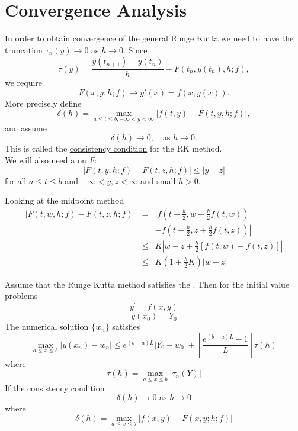 \section{Convergence Analysis}
In order to obtain convergence of the general Runge Kutta we need to have the truncation
$\tau_n(y)\rightarrow0$ as $h \rightarrow 0$.  Since
\[\tau(y)=\frac{y(t_{n+1})-y(t_n)}{h}-F(t_n,y(t_n),h;f), \]
we require
\[F(x,y,h;f)\rightarrow y{'}(x)=f(x,y(x)). \]
More precisely define
\[\delta(h)= \max_{a\leq t \leq b ; -\infty < y <\infty} |f(t,y)-F(t,y,h;f)|, \]
and assume
\begin{equation}
\label{C}
 \delta(h) \rightarrow 0, \ \ \ \mbox{ as } h \rightarrow 0.
 \end{equation}
This is called the \underline{consistency condition} for the RK method.\\
We will also need a  on $F$:
\begin{equation}
\label{L}
|F(t,y,h;f)-F(t,z,h;f)|\leq |y-z|
 \end{equation}
for all $a\leq t \leq b$ and $-\infty <y,z < \infty $ and small $h >0$.
\begin{example}
Looking at the midpoint method
\begin{eqnarray*}
|F(t,w,h;f)-F(t,z,h;f)| &=&
\left|f(t+\frac{h}{2},w+\frac{h}{2}f(t,w)) \right. \\
& & \left. -f(t+\frac{h}{2},z+\frac{h}{2}f(t,z) )
 \right|\\
&\leq& K \left| w-z +\frac{h}{2}[f(t,w)-f(t,z) ]\right|\\
&\leq &	K \left(1 +\frac{h}{2}K \right)|w-z|
\end{eqnarray*}
\end{example}
\begin{theorem}
Assume that the Runge Kutta method satisfies the . Then
for the initial value problems
\[ y^{'}=f(x,y)\]
\[ y(x_0)=Y_0 \]
The numerical solution $\{ w_n\}$ satisfies
\[ \max_{a\leq x\leq b}|y(x_n)-w_n| \leq e^{(b-a)L}|Y_0-w_0|+\left[\frac{e^{(b-a)L}-1}{L} \right]\tau(h) \]
where
\[\tau(h) = \max_{a\leq x\leq b}|\tau_n(Y)|\]
If the consistency condition 
\[ \delta(h) \rightarrow 0 \mbox{ as  } h\rightarrow 0 \]
where
\[\delta(h) = \max_{a \leq x \leq b}|f(x,y)-F(x,y;h;f)| \]

\end{theorem}

